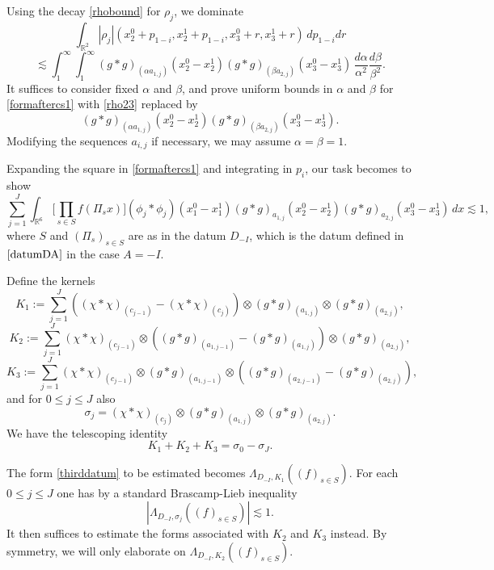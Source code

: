 \documentclass[12pt,reqno]{amsart}
\theoremstyle{plain}
\theoremstyle{definition}
\numberwithin{equation}{section}
\newcommand{\R}{{\mathbb R}}
\begin{document}
Using the decay \eqref{rhobound} for $\rho_{j}$,  we dominate 
\begin{equation}\label{rho23}
\int_{\R^2} |\rho_{j} | (x_2^0+p_{1-i},x_{2}^1+p_{1-i},x_3^0+r,x_3^1+r)\, dp_{1-i} dr
\end{equation}
\[ \lesssim \int_1^\infty \int_1^\infty (g*g)_{(\alpha a_{1,j})} (x_2^0-x_2^1)
(g*g)_{(\beta a_{2,j})}(x_3^0-x_3^1)  \,  \frac {d\alpha}{\alpha^2}  \frac {d\beta}{\beta^2}. \]
It suffices to consider fixed $\alpha$ and $\beta$, and prove uniform bounds
in $\alpha$ and $\beta$  for  \eqref{formaftercs1} with \eqref{rho23} replaced  by
\[(g*g)_{(\alpha a_{1,j})}
(x_2^0-x_2^1)
(g*g)_{(\beta a_{2,j})}(x_3^0-x_3^1) .\] 
Modifying the sequences $a_{i,j}$ if necessary, we may assume
$\alpha=\beta=1$.






Expanding the square in \eqref{formaftercs1} and integrating in $p_i$, our task
becomes to show
\begin{equation}\label{thirddatum}
\sum_{j=1}^J  \int_{\R^6}  \Big[  \prod_{s\in S} f (\Pi_sx)\Big]   (\phi_{j}*\phi_{j})(x_1^0-x_1^1)  
    (g * g)_{a_{1,j}}(x_2^0-x_2^1)  (g * g)_{ a_{2,j}}(x_3^0-x_3^1) \, dx  \lesssim 1,
\end{equation}
where $S$ and $(\Pi_s)_{s\in S}$ are as in the datum $D_{-I}$, which is the datum defined in $\eqref{datumDA}$ in the   case $A=-I$.


 Define the kernels
\begin{equation*}
     K_{1}  := %
        \sum_{j=1}^J ((\chi*\chi)_{(c_{j-1})} - (\chi*\chi)_{(c_{j})})\otimes (g* g)_{( a_{1,j})}\otimes  (g * g)_{( a_{2,j})}, 
\end{equation*} 
\[K_{2}:=\sum_{j=1}^J  (\chi*\chi)_{(c_{j-1})}\otimes ((g* g)_{( a_{1,j-1})} - (g* g)_{( a_{1,j})})\otimes (g * g)_{( a_{2,j})},\]
\[K_{3} := \sum_{j=1}^J  (\chi*\chi)_{(c_{j-1})} \otimes (g* g)_{( a_{1,j-1})} \otimes ((g  * g)_{( a_{2,j-1})} - (g * g)_{( a_{2,j})}),\]
and for $0\leq j \leq J$ also
\[\sigma_{j} = (\chi*\chi)_{(c_{j})}\otimes (g* g)_{( a_{1,j})}\otimes (g  * g)_{( a_{2,j})}.  \]
We have the telescoping identity
\begin{equation}
    \label{telesocpingid}
K_{1}+K_{2}+K_{3} = \sigma_{0} - \sigma_{J}.
\end{equation}

The form  \eqref{thirddatum} to be estimated becomes $\Lambda_{D_{-I}, K_{1}}((f)_{s\in S})$. 
For each $0\leq j \leq J$ one has by a standard Brascamp-Lieb inequality
\[|\Lambda_{D_{-I}, \sigma_{j}}((f)_{s\in S})| \lesssim 1. \]
It then suffices to estimate
the forms associated with $K_2$ and $K_3$ instead. By symmetry, we will only elaborate on  $\Lambda_{D_{-I}, K_{2}}((f)_{s\in S})$. 
\end{document}
